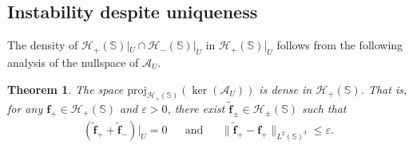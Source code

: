 \documentclass[a4paper, 11pt]{article}
\newtheorem{theorem}{Theorem}
\renewcommand{\SS}{\mathbb{S}}
\newcommand{\f}{\mathbf{f}}
\newcommand{\eps}{\varepsilon}
\begin{document}
\subsection{Instability despite uniqueness}\label{subsubsec:instability}

The density of $\mathcal H_+(\SS)|_{U} \cap \mathcal H_-(\SS)|_{U}$ in $\mathcal H_+(\SS)|_{U}$ follows from the following analysis of the nullspace of $\mathcal A_{U}$.

\begin{theorem}\label{thm:projnullspace}
  The space $\mathrm{proj}_{\mathcal H_+(\SS)}(\ker(\mathcal A_{U}))$ is dense in $\mathcal H_+(\SS)$. That is, for any $\f_+\in\mathcal H_+(\SS)$ and $\eps>0$, there exist $\tilde{\f}_\pm\in \mathcal H_\pm(\SS)$ such that
  \begin{align}\label{eqn:desity_1}
      (\tilde{\f}_++\tilde{\f}_-)|_U=0 && \text{and} &&\|\tilde{\f}_+-\f_+\|_{L^2(\SS)^3}\leq \eps.
  \end{align}
\end{theorem}
\end{document}
